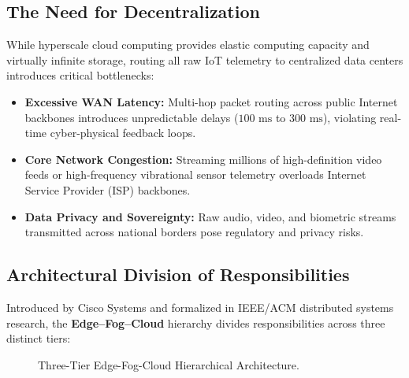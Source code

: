 \subsection{The Need for Decentralization}
While hyperscale cloud computing provides elastic computing capacity and virtually infinite storage, routing all raw IoT telemetry to centralized data centers introduces critical bottlenecks:
\begin{itemize}[leftmargin=*]
  \item \textbf{Excessive WAN Latency:} Multi-hop packet routing across public Internet backbones introduces unpredictable delays ($100\text{ ms}$ to $300\text{ ms}$), violating real-time cyber-physical feedback loops.
  \item \textbf{Core Network Congestion:} Streaming millions of high-definition video feeds or high-frequency vibrational sensor telemetry overloads Internet Service Provider (ISP) backbones.
  \item \textbf{Data Privacy and Sovereignty:} Raw audio, video, and biometric streams transmitted across national borders pose regulatory and privacy risks.
\end{itemize}

\subsection{Architectural Division of Responsibilities}
Introduced by Cisco Systems and formalized in IEEE/ACM distributed systems research, the \textbf{Edge--Fog--Cloud} hierarchy divides responsibilities across three distinct tiers:

\begin{figure}[H]
\centering
{}
\caption{Three-Tier Edge-Fog-Cloud Hierarchical Architecture.}
\end{figure}

